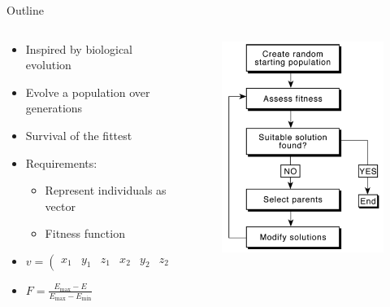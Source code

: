 \documentclass[10pt]{beamer}
\begin{document}
{%
\begin{frame}{Outline}
	\begin{columns}[c] %
		\begin{column}{.48\textwidth}
			\begin{itemize}[<+->]
				\item {Inspired by biological evolution}
				\item {Evolve a population over generations}
				\item {Survival of the fittest}
				\item {Requirements:}
				\begin{itemize}
					\item {Represent individuals as vector}
					\item {Fitness function}
				\end{itemize}
				\item{$v = \left(\begin{smallmatrix}
					x_1 & y_1 & z_1 & x_2 &  y_2 & z_2 &
					\cdots & x_N & y_N & z_N
					\end{smallmatrix}\right)$}
				\item{$F = \frac{E_{\max} - E}{E_{\max} - E_{\min}}$}
			\end{itemize}

		\end{column}
		\hfill
		\begin{column}{0.48\textwidth}
			\begin{figure}
			\includegraphics[width=0.8\linewidth]{images/GA_outline_Carwright.PNG}
			\end{figure}
		\end{column}
	\end{columns}
\end{frame}
}
\end{document}
